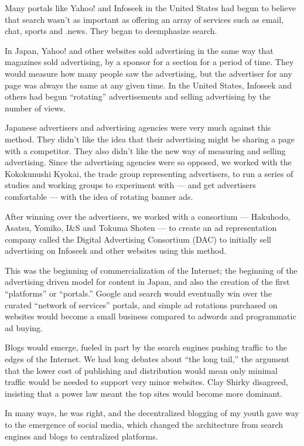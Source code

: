 Many portals like Yahoo! and Infoseek in the United States had begun to believe that search wasn't as important as offering an array of services such as email, chat, sports and .news. They began to deemphasize search. 

In Japan, Yahoo! and other websites sold advertising in the same way that magazines sold advertising, by a sponsor for a section for a period of time. They would measure how many people saw the advertising, but the advertiser for any page was always the same at any given time. In the United States, Infoseek and others had begun ``rotating'' advertisements and selling advertising by the number of views.

Japanese advertisers and advertising agencies were very much against this method. They didn't like the idea that their advertising might be sharing a page with a competitor. They also didn't like the new way of measuring and selling advertising. Since the advertising agencies were so opposed, we worked with the Kokokunushi Kyokai, the trade group representing advertisers, to run a series of studies and working groups to experiment with --- and get advertisers comfortable --- with the idea of rotating banner ads.

After winning over the advertisers, we worked with a consortium --- Hakuhodo, Asatsu, Yomiko, I\&S and Tokuma Shoten --- to create an ad representation company called the Digital Advertising Consortium (DAC) to initially sell advertising on Infoseek and other websites using this method.

This was the beginning of commercialization of the Internet; the beginning of the advertising driven model for content in Japan, and also the creation of the first ``platforms'' or ``portals.'' Google and search would eventually win over the curated ``network of services'' portals, and simple ad rotations purchased on websites would become a small business compared to adwords and programmatic ad buying.

Blogs would emerge, fueled in part by the search engines pushing traffic to the edges of the Internet. We had long debates about ``the long tail,'' the argument that the lower cost of publishing and distribution would mean only minimal traffic would be needed to support very minor websites. Clay Shirky disagreed, insisting that a power law meant the top sites would become more dominant.

In many ways, he was right, and the decentralized blogging of my youth gave way to the emergence of social media, which changed the architecture from search engines and blogs to centralized platforms.


